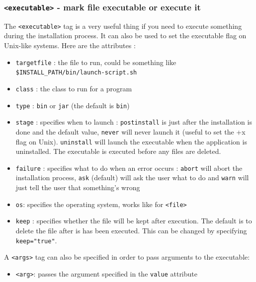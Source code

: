 \subsubsection{\texttt{<executable>} - mark file executable or execute it}

The \texttt{<executable>} tag is a very useful thing if you need to execute
something during the installation process. It can also be used to set the
executable flag on Unix-like systems. Here are the attributes :

\begin{itemize}

  \item \texttt{targetfile} : the file to run, could be something like\\
  \texttt{\$INSTALL\_PATH/bin/launch-script.sh}

  \item \texttt{class} : the class to run for a \Java program

  \item \texttt{type} : \texttt{bin} or \texttt{jar} (the default is
  \texttt{bin})

  \item \texttt{stage} : specifies when to launch : \texttt{postinstall}
  is just after the installation is done and the default value,
  \texttt{never} will never launch it (useful to set the +x flag on Unix).
  \texttt{uninstall} will launch the executable when the application
  is uninstalled. The executable is executed before any files are deleted.

  \item \texttt{failure} : specifies what to do when an error occurs :
  \texttt{abort} will abort the installation process, \texttt{ask} (default)
  will ask the user what to do and \texttt{warn} will just tell the user
  that something's wrong

  \item \texttt{os}: specifies the operating system, works like for
  \texttt{<file>}

  \item \texttt{keep} : specifies whether the file will be kept after
  execution. The default is to delete the file after is has been executed.
  This can be changed by specifying \texttt{keep="true"}.

\end{itemize}
A \texttt{<args>} tag can also be specified in order to pass
arguments to the executable:
\begin{itemize}

  \item \texttt{<arg>}: passes the argument specified in the
  \texttt{value} attribute

\end{itemize}
  
